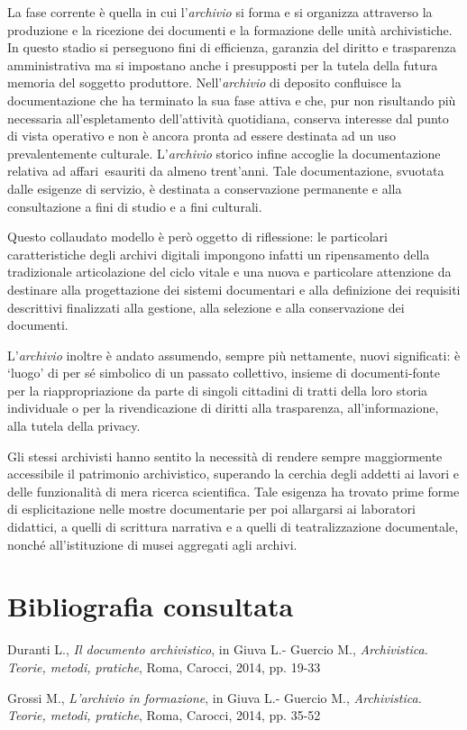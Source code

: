 La fase corrente è quella in cui l'\emph{archivio} si forma e si
organizza attraverso la produzione e la ricezione dei documenti e la
formazione delle unità archivistiche. In questo stadio si perseguono
fini di efficienza, garanzia del diritto e trasparenza amministrativa ma
si impostano anche i presupposti per la tutela della futura memoria del
soggetto produttore. Nell'\emph{archivio} di deposito confluisce la
documentazione che ha terminato la sua fase attiva e che, pur non
risultando più necessaria all'espletamento dell'attività quotidiana,
conserva interesse dal punto di vista operativo e non è ancora pronta ad
essere destinata ad un uso prevalentemente culturale. L'\emph{archivio}
storico infine accoglie la documentazione relativa ad affari~esauriti da
almeno trent'anni. Tale documentazione, svuotata dalle esigenze di
servizio, è destinata a conservazione permanente e alla consultazione a
fini di studio e a fini culturali.

Questo collaudato modello è però oggetto di riflessione: le particolari
caratteristiche degli archivi digitali impongono infatti un ripensamento
della tradizionale articolazione del ciclo vitale e una nuova e
particolare attenzione da destinare alla progettazione dei sistemi
documentari e alla definizione dei requisiti descrittivi finalizzati
alla gestione, alla selezione e alla conservazione dei documenti.

L'\emph{archivio} inoltre è andato assumendo, sempre più nettamente,
nuovi significati: è `luogo' di per sé simbolico di un passato
collettivo, insieme di documenti-fonte per la riappropriazione da parte
di singoli cittadini di tratti della loro storia individuale o per la
rivendicazione di diritti alla trasparenza, all'informazione, alla
tutela della privacy.

Gli stessi archivisti hanno sentito la necessità di rendere sempre
maggiormente accessibile il patrimonio archivistico, superando la
cerchia degli addetti ai lavori e delle funzionalità di mera ricerca
scientifica. Tale esigenza ha trovato prime forme di esplicitazione
nelle mostre documentarie per poi allargarsi ai laboratori didattici, a
quelli di scrittura narrativa e a quelli di teatralizzazione
documentale, nonché all'istituzione di musei aggregati agli archivi.

\section*{Bibliografia consultata}
{\parindent0pt 
Duranti L., \emph{Il documento archivistico}, in Giuva L.- Guercio M.,
\emph{Archivistica. Teorie, metodi, pratiche}, Roma, Carocci, 2014, pp.
19-33

Grossi M., \emph{L'archivio in formazione}, in Giuva L.- Guercio M.,
\emph{Archivistica. Teorie, metodi, pratiche}, Roma, Carocci, 2014, pp.
35-52
}

